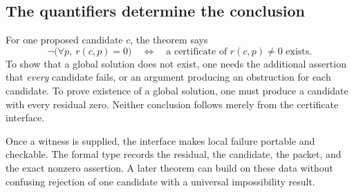 \subsection{The quantifiers determine the conclusion}
For one proposed candidate $c$, the theorem says
\[
 \neg\bigl(\forall p,\ r(c,p)=0\bigr)
 \quad\Longleftrightarrow\quad
 \text{a certificate of }r(c,p)\ne0\text{ exists}.
\]
To show that a global solution does not exist, one needs the additional assertion that \emph{every} candidate fails, or an argument producing an obstruction for each candidate. To prove existence of a global solution, one must produce a candidate with every residual zero. Neither conclusion follows merely from the certificate interface.

Once a witness is supplied, the interface makes local failure portable and checkable. The formal type records the residual, the candidate, the packet, and the exact nonzero assertion. A later theorem can build on these data without confusing rejection of one candidate with a universal impossibility result.
